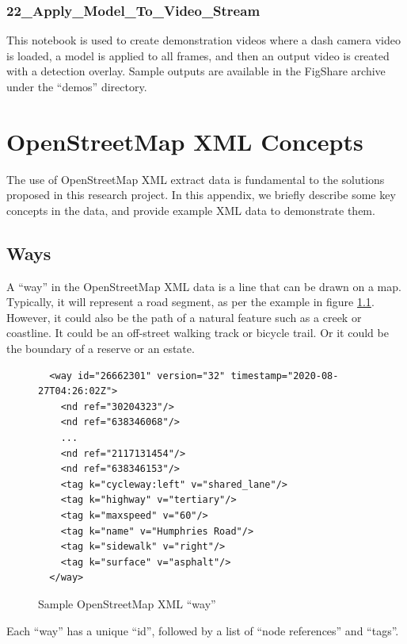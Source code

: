 \documentclass[11pt,twoside]{report}
\begin{document}
\subsection{22\_Apply\_Model\_To\_Video\_Stream}
\label{a22}

This notebook is used to create demonstration videos where a dash camera video is loaded, a model is applied to all frames, and then an output video is created with a detection overlay.  Sample outputs are available in the FigShare archive under the ``demos'' directory.


\chapter{OpenStreetMap XML Concepts}
\label{a:osm_concepts}

The use of OpenStreetMap XML extract data is fundamental to the solutions proposed in this research project.  In this appendix, we briefly describe some key concepts in the data, and provide example XML data to demonstrate them.

\section{Ways}
\label{osm:ways}

A ``way'' in the OpenStreetMap XML data is a line that can be drawn on a map.  Typically, it will represent a road segment, as per the example in figure \ref{xml:way_st}.  However, it could also be the path of a natural feature such as a creek or coastline.  It could be an off-street walking track or bicycle trail.  Or it could be the boundary of a reserve or an estate.

\begin{figure}[t]
\centering
\begin{verbatim}
  <way id="26662301" version="32" timestamp="2020-08-27T04:26:02Z">
    <nd ref="30204323"/>
    <nd ref="638346068"/>
    ...
    <nd ref="2117131454"/>
    <nd ref="638346153"/>
    <tag k="cycleway:left" v="shared_lane"/>
    <tag k="highway" v="tertiary"/>
    <tag k="maxspeed" v="60"/>
    <tag k="name" v="Humphries Road"/>
    <tag k="sidewalk" v="right"/>
    <tag k="surface" v="asphalt"/>
  </way>
\end{verbatim}
\caption{Sample OpenStreetMap XML ``way''}
\label{xml:way_st}
\end{figure}

Each ``way'' has a unique ``id'', followed by a list of ``node references'' and ``tags''.
\end{document}
